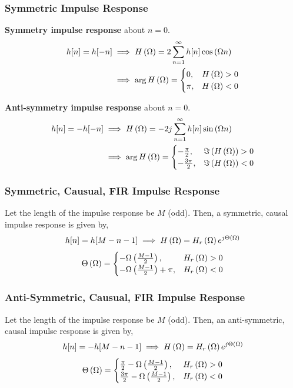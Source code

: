 \documentclass[aspectratio=169]{beamer}
\def\lp{\ensuremath\left(}
\def\rp{\ensuremath\right)}
\begin{document}
\begin{frame}[t]
  \frametitle{Symmetric Impulse Response}
  
  \textbf{Symmetry impulse response} about $n = 0$.
  \[ \begin{split} h[n] = h[-n] & \implies H\lp \Omega \rp = 2 \sum_{n=1}^{\infty} h[n] \cos \lp \Omega n\rp \\ 
      & \implies \arg H\lp \Omega \rp = \begin{cases} 0, & H\lp \Omega \rp > 0 \\ \pi, & H\lp \Omega \rp < 0 \end{cases}
     \end{split}
     \]
  
  \textbf{Anti-symmetry impulse response} about $n = 0$.
  \[ \begin{split} h[n] = -h[-n] & \implies H\lp \Omega \rp = -2j \sum_{n=1}^{\infty} h[n] \sin \lp \Omega n\rp \\ 
      & \implies \arg H\lp \Omega \rp = \begin{cases} -\frac{\pi}{2}, & \Im \lp H\lp \Omega \rp \rp > 0 \\ -\frac{3\pi}{2}, & \Im \lp H\lp \Omega \rp \rp < 0 \end{cases}
     \end{split}
     \]
\end{frame}


\begin{frame}[t]
  \frametitle{Symmetric, Causual, FIR Impulse Response}
  
  Let the length of the impulse response be $M$ (odd). Then, a symmetric, causal impulse response is given by,
  \[ h[n] = h[M - n -1] \implies H\lp \Omega \rp = H_r\lp \Omega \rp e^{j \Theta\lp \Omega \rp}\]
  \[ \Theta\lp \Omega \rp = \begin{cases} -\Omega \lp \frac{M-1}{2}\rp, & H_r\lp \Omega \rp > 0 \\ -\Omega \lp \frac{M-1}{2} \rp + \pi, & H_r\lp \Omega \rp < 0 \\ \end{cases} \]
\end{frame}


\begin{frame}[t]
  \frametitle{Anti-Symmetric, Causual, FIR Impulse Response}
  
  Let the length of the impulse response be $M$ (odd). Then, an anti-symmetric, causal impulse response is given by,
  \[ h[n] = -h[M - n -1] \implies H\lp \Omega \rp = H_r\lp \Omega \rp e^{j \Theta\lp \Omega \rp}\]
  \[ \Theta\lp \Omega \rp = \begin{cases} \frac{\pi}{2} - \Omega \lp \frac{M-1}{2}\rp, & H_r\lp \Omega \rp > 0 \\ \frac{3\pi}{2}  - \Omega \lp \frac{M-1}{2} \rp, & H_r\lp \Omega \rp < 0 \\ \end{cases} \]
\end{frame}
\end{document}
